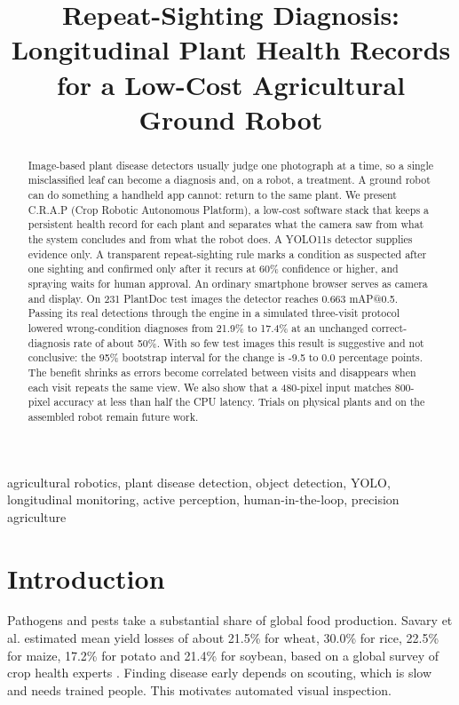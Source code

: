 \documentclass[conference]{IEEEtran}
\begin{document}
\title{Repeat-Sighting Diagnosis: Longitudinal Plant Health Records for a Low-Cost Agricultural Ground Robot}
\author{}
\maketitle
\begin{abstract}Image-based plant disease detectors usually judge one photograph at a time, so a single misclassified leaf can become a diagnosis and, on a robot, a treatment. A ground robot can do something a handheld app cannot: return to the same plant. We present C.R.A.P (Crop Robotic Autonomous Platform), a low-cost software stack that keeps a persistent health record for each plant and separates what the camera saw from what the system concludes and from what the robot does. A YOLO11s detector supplies evidence only. A transparent repeat-sighting rule marks a condition as suspected after one sighting and confirmed only after it recurs at 60\% confidence or higher, and spraying waits for human approval. An ordinary smartphone browser serves as camera and display. On 231 PlantDoc test images the detector reaches 0.663 mAP@0.5. Passing its real detections through the engine in a simulated three-visit protocol lowered wrong-condition diagnoses from 21.9\% to 17.4\% at an unchanged correct-diagnosis rate of about 50\%. With so few test images this result is suggestive and not conclusive: the 95\% bootstrap interval for the change is -9.5 to 0.0 percentage points. The benefit shrinks as errors become correlated between visits and disappears when each visit repeats the same view. We also show that a 480-pixel input matches 800-pixel accuracy at less than half the CPU latency. Trials on physical plants and on the assembled robot remain future work.\end{abstract}
\begin{IEEEkeywords}agricultural robotics, plant disease detection, object detection, YOLO, longitudinal monitoring, active perception, human-in-the-loop, precision agriculture\end{IEEEkeywords}
\section{Introduction}
Pathogens and pests take a substantial share of global food production. Savary et al. estimated mean yield losses of about 21.5\% for wheat, 30.0\% for rice, 22.5\% for maize, 17.2\% for potato and 21.4\% for soybean, based on a global survey of crop health experts \cite{savary}. Finding disease early depends on scouting, which is slow and needs trained people. This motivates automated visual inspection.
\end{document}
